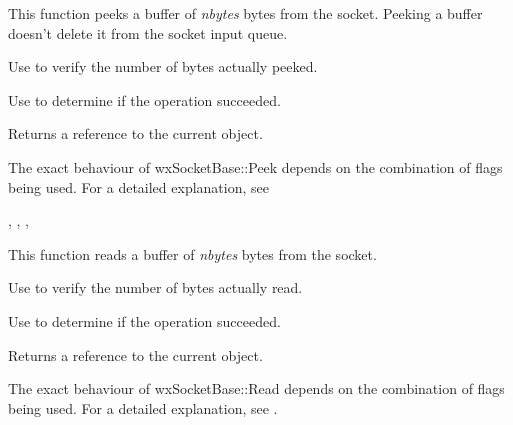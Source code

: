 
This function peeks a buffer of {\it nbytes} bytes from the socket.
Peeking a buffer doesn't delete it from the socket input queue.

Use  to verify the number of bytes actually peeked.

Use  to determine if the operation succeeded.





Returns a reference to the current object.


The exact behaviour of wxSocketBase::Peek depends on the combination
of flags being used. For a detailed explanation, see 


, 
, 
, 

%
%
\label{wxsocketbaseread}


This function reads a buffer of {\it nbytes} bytes from the socket.

Use  to verify the number of bytes actually read.

Use  to determine if the operation succeeded.





Returns a reference to the current object.


The exact behaviour of wxSocketBase::Read depends on the combination
of flags being used. For a detailed explanation, see .

